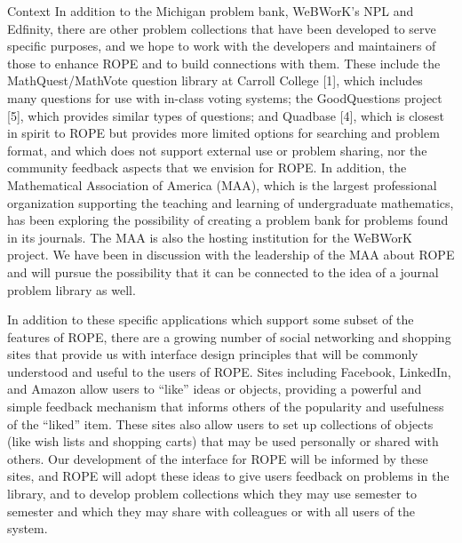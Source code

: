 \documentclass[11pt]{article}
\begin{document}
\begin{section}{Context}
In addition to the Michigan problem bank, WeBWorK's NPL and Edfinity, there are
other problem collections that have been developed to serve specific
purposes, and we hope to work with the developers and maintainers of those
to enhance ROPE and to build connections with them.  These include the
MathQuest/MathVote question library at Carroll College [1], %
which includes many questions for use with in-class voting systems; the
GoodQuestions project [5], %
which provides similar types of
questions; and Quadbase [4], %
which is closest in spirit to ROPE but provides more limited options for 
searching and problem format,
and which does not support external use or problem sharing, nor the
community feedback aspects that we envision for ROPE.  In addition, the
Mathematical Association of America (MAA), which is the largest
professional organization supporting the teaching and learning of
undergraduate mathematics, has been exploring the possibility of creating
a problem bank for problems found in its journals.  The MAA is also the
hosting institution for the WeBWorK project.  We have been in discussion
with the leadership of the MAA about ROPE and will pursue the
possibility that it can be connected to the idea of a journal problem
library as well.

In addition to these specific applications which support some subset of
the features of ROPE, there are a growing number of social networking
and shopping sites that provide us with interface design principles that
will be commonly understood and useful to the users of ROPE.  Sites
including Facebook, LinkedIn, and Amazon allow users to ``like'' ideas or
objects, providing a powerful and simple feedback mechanism that informs
others of the popularity and usefulness of the ``liked'' item.  These
sites also allow users to set up collections of objects (like wish lists
and shopping carts) that may be used personally or shared with others.
Our development of the interface for ROPE will be informed by these
sites, and ROPE will adopt these ideas to give users feedback on
problems in the library, and to develop problem collections which they may
use semester to semester and which they may share with colleagues or with
all users of the system.


\end{section}
\end{document}
